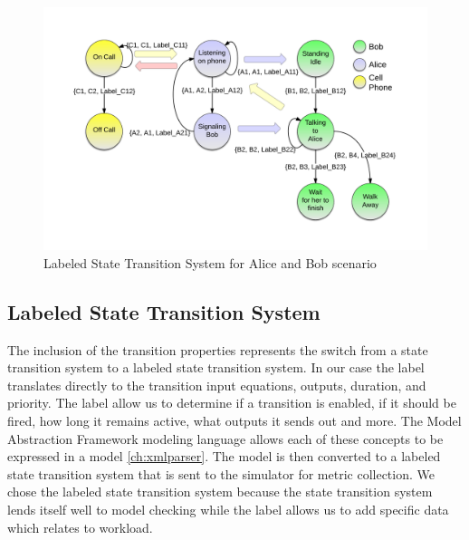 \begin{figure}[h]
\begin{center}
\includegraphics[width=\textwidth]{ab_lsts.png}
\caption{Labeled State Transition System for Alice and Bob scenario}
\label{fig:ab_lsts}
\end{center}
\end{figure}

\subsection{Labeled State Transition System}
The inclusion of the transition properties represents the switch from a state transition system to a labeled state transition system.  In our case the label translates directly to the transition input equations, outputs, duration, and priority.  The label allow us to determine if a transition is enabled, if it should be fired, how long it remains active, what outputs it sends out and more.  
The Model Abstraction Framework modeling language allows each of these concepts to be expressed in a model \ref{ch:xmlparser}.  The model is then converted to a labeled state transition system that is sent to the simulator for metric collection.  We chose the labeled state transition system because the state transition system lends itself well to model checking while the label allows us to add specific data which relates to workload.  


